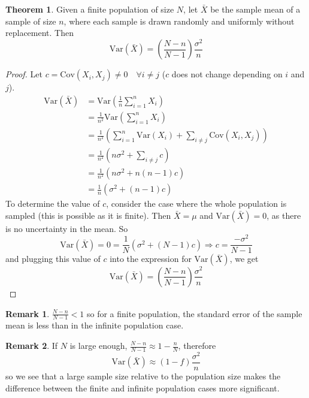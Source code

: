 \documentclass[12pt,a4paper]{article}
\theoremstyle{definition}
\newtheorem{theorem}[definition]{Theorem}
\newtheorem*{remark}{Remark}
\begin{document}
\begin{theorem}
	Given a finite population of size $N$, let $\bar{X}$ be the sample mean of a sample of size $n$, where each sample is drawn randomly and uniformly without replacement. Then
	\[
		\text{Var}(\bar{X}) = \left( \frac{N - n}{N - 1} \right) \frac{\sigma^2}{n}
	\]
\end{theorem}

\begin{proof}
	Let $c = \text{Cov}(X_i, X_j) \ne 0 \quad \forall i \ne j$ ($c$ does not change depending on $i$ and $j$).
	\[
		\begin{aligned}
			\text{Var}(\bar{X})
				& = \text{Var} \left( \frac{1}{n} \sum_{i = 1}^{n} X_i \right) \\
				& = \frac{1}{n^2} \text{Var} \left( \sum_{i = 1}^{n} X_i \right) \\
				& = \frac{1}{n^2} \left( \sum_{i = 1}^{n} \text{Var}(X_i) + \sum_{i \ne j} \text{Cov}(X_i, X_j) \right) \\
				& = \frac{1}{n^2} \left( n \sigma^2 + \sum_{i \ne j} c \right) \\
				& = \frac{1}{n^2} \left( n \sigma^2 + n(n - 1)c \right) \\
				& = \frac{1}{n} \left( \sigma^2 + (n - 1)c \right)
		\end{aligned}
	\]
	To determine the value of $c$, consider the case where the whole population is sampled (this is possible as it is finite). Then $\bar{X} = \mu$ and $\text{Var}(\bar{X}) = 0$, as there is no uncertainty in the mean. So
	\[
		\text{Var}(\bar{X}) = 0 = \frac{1}{N} (\sigma^2 + (N - 1)c) \Longrightarrow c = \frac{-\sigma^2}{N - 1}
	\]
	and plugging this value of $c$ into the expression for $\text{Var}(\bar{X})$, we get
	\[
		\text{Var}(\bar{X}) = \left( \frac{N - n}{N - 1} \right) \frac{\sigma^2}{n}
	\]
\end{proof}

\begin{remark}
	$\frac{N - n}{N - 1} < 1$ so for a finite population, the standard error of the sample mean is less than in the infinite population case.
\end{remark}

\begin{remark}
	If $N$ is large enough, $\frac{N - n}{N - 1} \approx 1 - \frac{n}{N}$, therefore
	\[
		\text{Var}(\bar{X}) \approx (1 - f) \frac{\sigma^2}{n}
	\]
	so we see that a large sample size relative to the population size makes the difference between the finite and infinite population cases more significant.
\end{remark}
\end{document}
